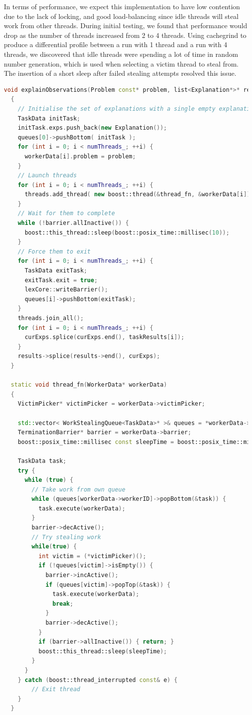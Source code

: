 \documentclass[12pt,twoside,abbrevs,msc,ai,notimes,logo,sansheadings]{infthesis}
\begin{document}
  In terms of performance, we expect this implementation to have low contention due to the lack of locking, and good load-balancing since idle threads will steal work from other threads. During initial testing, we found that performance would drop as the number of threads increased from 2 to 4 threads. Using cachegrind to produce a differential profile between a run with 1 thread and a run with 4 threads, we discovered that idle threads were spending a lot of time in random number generation, which is used when selecting a victim thread to steal from. The insertion of a short sleep after failed stealing attempts resolved this issue.
   
  \begin{lstlisting}[language=C++]
  void explainObservations(Problem const* problem, list<Explanation*>* results)
  {
    // Initialise the set of explanations with a single empty explanation
    TaskData initTask;
    initTask.exps.push_back(new Explanation());
    queues[0]->pushBottom( initTask );
    for (int i = 0; i < numThreads_; ++i) {
      workerData[i].problem = problem;
    }
    // Launch threads
    for (int i = 0; i < numThreads_; ++i) {
      threads.add_thread( new boost::thread(&thread_fn, &workerData[i]) );
    }
    // Wait for them to complete
    while (!barrier.allInactive()) {
      boost::this_thread::sleep(boost::posix_time::millisec(10));
    }
    // Force them to exit
    for (int i = 0; i < numThreads_; ++i) {
      TaskData exitTask;
      exitTask.exit = true;
      lexCore::writeBarrier();
      queues[i]->pushBottom(exitTask);
    }
    threads.join_all();
    for (int i = 0; i < numThreads_; ++i) {
      curExps.splice(curExps.end(), taskResults[i]);
    }
    results->splice(results->end(), curExps);
  }
  
  static void thread_fn(WorkerData* workerData)
  {
    VictimPicker* victimPicker = workerData->victimPicker;

    std::vector< WorkStealingQueue<TaskData>* >& queues = *workerData->queues;
    TerminationBarrier* barrier = workerData->barrier;
    boost::posix_time::millisec const sleepTime = boost::posix_time::millisec(1);

    TaskData task;
    try {
      while (true) {
        // Take work from own queue
        while (queues[workerData->workerID]->popBottom(&task)) {
          task.execute(workerData);
        }
        barrier->decActive();
        // Try stealing work
        while(true) {
          int victim = (*victimPicker)();
          if (!queues[victim]->isEmpty()) {
            barrier->incActive();
            if (queues[victim]->popTop(&task)) {
              task.execute(workerData);
              break;
            }
            barrier->decActive();
          }
          if (barrier->allInactive()) { return; }
          boost::this_thread::sleep(sleepTime);
        }
      }
    } catch (boost::thread_interrupted const& e) {
        // Exit thread
    }
  }


\end{lstlisting}
\end{document}
